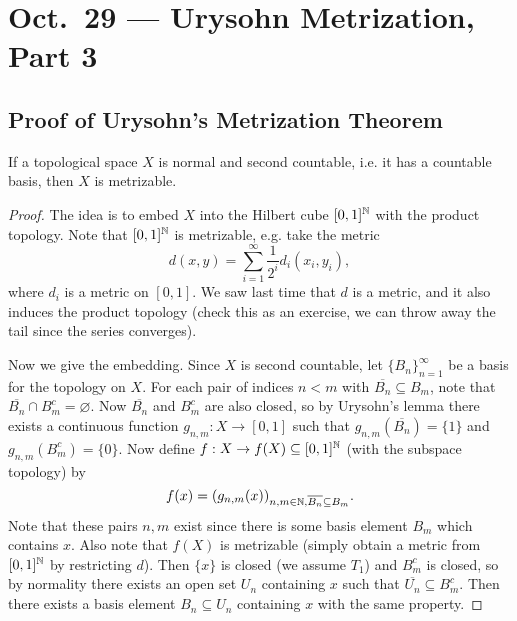 \chapter{Oct.~29 --- Urysohn Metrization, Part 3}

\section{Proof of Urysohn's Metrization Theorem}

\begin{theorem}
  If a topological space $X$ is normal and second countable, i.e. it
  has a countable basis, then
  $X$ is metrizable.
\end{theorem}

\begin{proof}
  The idea is to embed $X$ into the Hilbert cube
  $[0, 1]^{\mathbb{N}}$ with the product topology. Note that
  $[0, 1]^{\mathbb{N}}$ is metrizable, e.g. take the metric
  \[
    d(x, y) = \sum_{i = 1}^\infty \frac{1}{2^i} 
    d_i(x_i, y_i),
  \]
  where $d_i$ is a metric on $[0, 1]$. We saw last
  time that $d$ is a metric, and it also induces
  the product topology (check this as an exercise,
  we can throw away the tail since the series
  converges).

  Now we give the embedding. Since $X$ is second
  countable, let $\{B_n\}_{n = 1}^\infty$ be a
  basis for the topology on $X$. For each pair of
  indices $n < m$ with $\overline{B_n} \subseteq B_m$,
  note that $\overline{B_n} \cap B_m^c = \varnothing$.
  Now $\overline{B_n}$ and $B_m^c$ are also
  closed, so by Urysohn's lemma there exists a
  continuous
  function $g_{n, m} : X \to [0, 1]$ such that
  $g_{n, m}(\overline{B_n}) = \{1\}$ and
  $g_{n, m}(B_m^c) = \{0\}$. Now define
  $f : X \to f(X) \subseteq [0, 1]^{\mathbb{N}}$ (with the
  subspace topology) by
  \[
    f(x) = (g_{n, m}(x))_{n, m \in \mathbb{N}, \overline{B_n} \subseteq B_m}.
  \]
  Note that these pairs $n, m$ exist since
  there is some basis element $B_m$ which contains
  $x$. Also note that $f(X)$ is metrizable (simply
  obtain a metric from $[0, 1]^{\mathbb{N}}$ by restricting
  $d$).
  Then $\{x\}$ is closed (we
  assume $T_1$) and $B_m^c$ is closed, so by
  normality there exists an open set $U_n$ containing
  $x$ such that $\overline{U_n} \subseteq B_m^c$.
  Then there exists a basis element $B_n \subseteq U_n$
  containing $x$ with the same property.


\end{proof}
